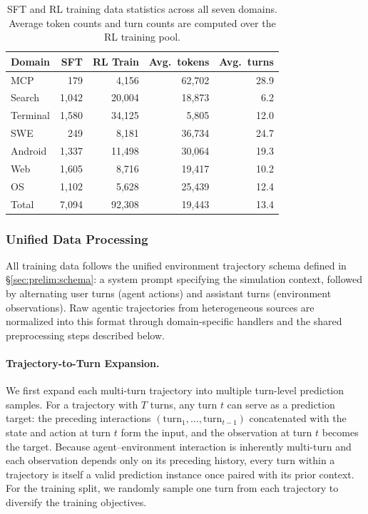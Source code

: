 \begin{table}[!ht]
\caption{SFT and RL training data statistics across all seven domains. Average token counts and turn counts are computed over the RL training pool.}
\label{tab:data_stats}
\centering
\small
\begin{tabular}{@{}lrrrr@{}}
\toprule
\textbf{Domain} & \textbf{SFT} & \textbf{RL Train} & \textbf{Avg.\ tokens} & \textbf{Avg.\ turns} \\
\midrule
MCP      & 179   & 4{,}156  & 62{,}702 & 28.9 \\
Search   & 1{,}042 & 20{,}004 & 18{,}873 & 6.2  \\
Terminal & 1{,}580 & 34{,}125 & 5{,}805  & 12.0 \\
SWE      & 249   & 8{,}181  & 36{,}734 & 24.7 \\
Android  & 1{,}337 & 11{,}498 & 30{,}064 & 19.3 \\
Web      & 1{,}605 & 8{,}716  & 19{,}417 & 10.2 \\
OS       & 1{,}102 & 5{,}628  & 25{,}439 & 12.4 \\
\midrule
Total & 7{,}094 & 92{,}308 & 19{,}443 & 13.4 \\
\bottomrule
\end{tabular}
\end{table}

\subsubsection{Unified Data Processing}

All training data follows the unified environment trajectory schema defined in \S\ref{sec:prelim:schema}: a system prompt specifying the simulation context, followed by alternating user turns (agent actions) and assistant turns (environment observations).
Raw agentic trajectories from heterogeneous sources are normalized into this format through domain-specific handlers and the shared preprocessing steps described below.

\paragraph{Trajectory-to-Turn Expansion.}
We first expand each multi-turn trajectory into multiple turn-level prediction samples.
For a trajectory with $T$ turns, any turn $t$ can serve as a prediction target: the preceding interactions $(\text{turn}_1, \ldots, \text{turn}_{t-1})$ concatenated with the state and action at turn $t$ form the input, and the observation at turn $t$ becomes the target.
Because agent--environment interaction is inherently multi-turn and each observation depends only on its preceding history, every turn within a trajectory is itself a valid prediction instance once paired with its prior context.
For the training split, we randomly sample one turn from each trajectory to diversify the training objectives.

